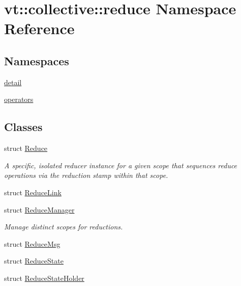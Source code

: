 \hypertarget{namespacevt_1_1collective_1_1reduce}{}\section{vt\+:\+:collective\+:\+:reduce Namespace Reference}
\label{namespacevt_1_1collective_1_1reduce}
\subsection*{Namespaces}
\begin{DoxyCompactItemize}
\item 
 \hyperlink{namespacevt_1_1collective_1_1reduce_1_1detail}{detail}
\item 
 \hyperlink{namespacevt_1_1collective_1_1reduce_1_1operators}{operators}
\end{DoxyCompactItemize}
\subsection*{Classes}
\begin{DoxyCompactItemize}
\item 
struct \hyperlink{structvt_1_1collective_1_1reduce_1_1_reduce}{Reduce}
\begin{DoxyCompactList}\small\item\em A specific, isolated reducer instance for a given scope that sequences reduce operations via the reduction stamp within that scope. \end{DoxyCompactList}\item 
struct \hyperlink{structvt_1_1collective_1_1reduce_1_1_reduce_link}{Reduce\+Link}
\item 
struct \hyperlink{structvt_1_1collective_1_1reduce_1_1_reduce_manager}{Reduce\+Manager}
\begin{DoxyCompactList}\small\item\em Manage distinct scopes for reductions. \end{DoxyCompactList}\item 
struct \hyperlink{structvt_1_1collective_1_1reduce_1_1_reduce_msg}{Reduce\+Msg}
\item 
struct \hyperlink{structvt_1_1collective_1_1reduce_1_1_reduce_state}{Reduce\+State}
\item 
struct \hyperlink{structvt_1_1collective_1_1reduce_1_1_reduce_state_holder}{Reduce\+State\+Holder}
\end{DoxyCompactItemize}
